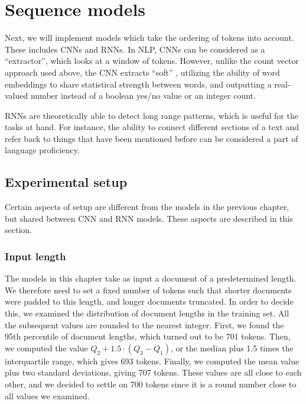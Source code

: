\chapter{Sequence models}

Next, we will implement models which take the ordering of tokens into
account. These includes \acp{CNN} and \acp{RNN}. In \ac{NLP}, \acp{CNN} can
be considered as a ``\ngram extractor'', which looks at a window of tokens.
However, unlike the count vector approach used above, the CNN extracts
``soft'' \ngrams, utilizing the ability of word embeddings to share
statistical strength between words, and outputting a real-valued number
instead of a boolean yes/no value or an integer count.

\acp{RNN} are theoretically able to detect long range patterns, which is
useful for the tasks at hand. For instance, the ability to connect different
sections of a text and refer back to things that have been mentioned before
can be considered a part of language proficiency.


\section{Experimental setup}

Certain aspects of setup are different from the models in the previous
chapter, but shared between \ac{CNN} and \ac{RNN} models. These aspects are
described in this section.


\subsection{Input length}

The models in this chapter take as input a document of a predetermined
length. We therefore need to set a fixed number of tokens such that shorter
documents were padded to this length, and longer documents truncated. In
order to decide this, we examined the distribution of document lengths in the
training set. All the subsequent values are rounded to the nearest integer.
First, we found the 95th percentile of document lengths, which turned out to
be 701 tokens. Then, we computed the value $Q_2 + 1.5 \cdot (Q_3 - Q_1)$, or
the median plus 1.5 times the interquartile range, which gives 693 tokens.
Finally, we computed the mean value plus two standard deviations, giving 707
tokens. These values are all close to each other, and we decided to settle on
700 tokens since it is a round number close to all values we examined.

